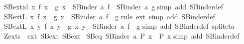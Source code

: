 \begin{isabellebody}
\endisatagproof
{\isafoldproof}%
%
\isadelimproof
\isanewline
%
\endisadelimproof
\isanewline
{}\isamarkupfalse%
\ SB{\isacharunderscore}ext{\isacharunderscore}id{\isacharcolon}\ {\isachardoublequoteopen}{\isacharparenleft}{\isasymAnd}x{\isachardot}\ f\ x\ {\isacharequal}\ g\ x{\isacharparenright}\ {\isasymLongrightarrow}\ SBinder\ a\ f\ {\isacharequal}\ SBinder\ a\ g{\isachardoublequoteclose}\isanewline
%
\isadelimproof
%
\endisadelimproof
%
\isatagproof
{}\isamarkupfalse%
{\isacharparenleft}simp\ add{\isacharcolon}\ SBinder{\isacharunderscore}def{\isacharparenright}%
\endisatagproof
{\isafoldproof}%
%
\isadelimproof
\isanewline
%
\endisadelimproof
\isanewline
{}\isamarkupfalse%
\ SB{}{\isacharunderscore}extL{\isacharcolon}\ {\isachardoublequoteopen}{\isacharparenleft}{\isasymAnd}x{\isachardot}\ f\ x\ {\isacharequal}\ g\ x{\isacharparenright}\ {\isasymLongrightarrow}\ SBinder{}\ a\ f\ {\isacharequal}\ g{\isachardoublequoteclose}\isanewline
%
\isadelimproof
%
\endisadelimproof
%
\isatagproof
{}\isamarkupfalse%
{\isacharparenleft}rule\ ext{\isacharcomma}\ simp\ add{\isacharcolon}\ SBinder{}{\isacharunderscore}def{\isacharparenright}%
\endisatagproof
{\isafoldproof}%
%
\isadelimproof
\isanewline
%
\endisadelimproof
\isanewline
{}\isamarkupfalse%
\ SB{\isacharunderscore}extL{\isacharcolon}\ {\isachardoublequoteopen}{\isacharparenleft}{\isasymAnd}x\ y{\isachardot}\ f\ x\ y\ {\isacharequal}\ g\ {\isacharparenleft}x{\isacharcomma}\ y{\isacharparenright}{\isacharparenright}\ {\isasymLongrightarrow}\ SBinder\ a\ f\ {\isacharequal}\ g{\isachardoublequoteclose}\isanewline
%
\isadelimproof
%
\endisadelimproof
%
\isatagproof
{}\isamarkupfalse%
{\isacharparenleft}simp\ add{\isacharcolon}\ SBinder{\isacharunderscore}def\ split{\isacharunderscore}eta{\isacharparenright}%
\endisatagproof
{\isafoldproof}%
%
\isadelimproof
\isanewline
%
\endisadelimproof
\isanewline
\isanewline
{}\isamarkupfalse%
\ Zexts\ {\isacharequal}\ ext\ SB{}{\isacharunderscore}ext\ SB{\isacharunderscore}ext\isanewline
\isanewline
{}\isamarkupfalse%
\ SB{}{\isacharunderscore}eq{\isacharcolon}\ {\isachardoublequoteopen}SBinder{}\ a\ P\ x\ {\isacharequal}\ P\ x{\isachardoublequoteclose}\isanewline
%
\isadelimproof
%
\endisadelimproof
%
\isatagproof
{}\isamarkupfalse%
{\isacharparenleft}simp\ add{\isacharcolon}\ SBinder{}{\isacharunderscore}def{\isacharparenright}%
\endisatagproof
{\isafoldproof}%

\end{isabellebody}
